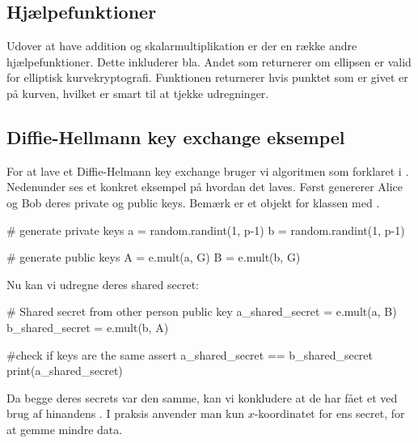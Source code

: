 \subsection{Hjælpefunktioner}
Udover at have addition og skalarmultiplikation er der en række andre hjælpefunktioner. Dette inkluderer bla. Andet  som returnerer om ellipsen er valid for elliptisk kurvekryptografi. Funktionen  returnerer  hvis punktet som er givet er på kurven, hvilket er smart til at tjekke udregninger. 

\subsection{Diffie-Hellmann key exchange eksempel}
For at lave et Diffie-Helmann key exchange bruger vi algoritmen som forklaret i . Nedenunder ses et konkret eksempel på hvordan det laves. Først genererer Alice og Bob deres private og public keys. Bemærk  er et objekt for klassen  med .
\begin{python}
# generate private keys
a = random.randint(1, p-1)
b = random.randint(1, p-1)

# generate public keys
A = e.mult(a, G)
B = e.mult(b, G)
\end{python}
Nu kan vi udregne deres shared secret:
\begin{python}
# Shared secret from other person public key
a_shared_secret = e.mult(a, B)
b_shared_secret = e.mult(b, A)

#check if keys are the same
assert a_shared_secret == b_shared_secret
print(a_shared_secret)
\end{python}

Da begge deres secrets var den samme, kan vi konkludere at de har fået et  ved brug af hinandens . I praksis anvender man kun $x$-koordinatet for ens secret, for at gemme mindre data.

